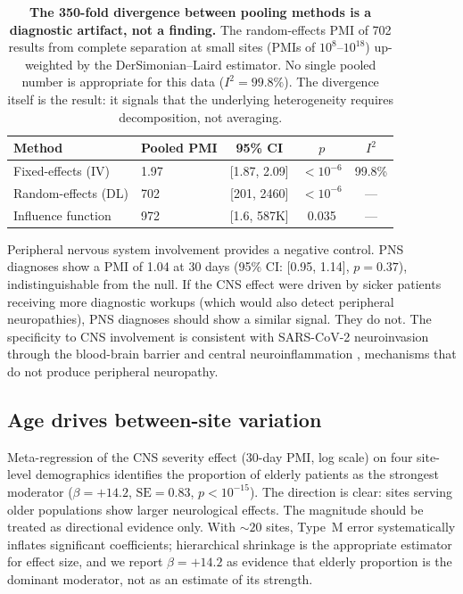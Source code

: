 \documentclass[11pt]{article}
\begin{document}
\begin{table}[t]
\centering
\caption{\textbf{The 350-fold divergence between pooling methods is a
diagnostic artifact, not a finding.}  The random-effects PMI of 702 results
from complete separation at small sites (PMIs of $10^{8}$--$10^{18}$)
up-weighted by the DerSimonian--Laird estimator.  No single pooled number
is appropriate for this data ($I^2 = 99.8\%$).  The divergence itself is
the result: it signals that the underlying heterogeneity requires
decomposition, not averaging.}
\label{tab:meta}
\begin{tabular}{llccc}
\toprule
Method & Pooled PMI & 95\% CI & $p$ & $I^2$ \\
\midrule
Fixed-effects (IV) & 1.97 & [1.87, 2.09] & $< 10^{-6}$ & 99.8\% \\
Random-effects (DL) & 702 & [201, 2460] & $< 10^{-6}$ & --- \\
Influence function & 972 & [1.6, 587K] & 0.035 & --- \\
\bottomrule
\end{tabular}
\end{table}

Peripheral nervous system involvement provides a negative control.  PNS
diagnoses show a PMI of 1.04 at 30 days (95\% CI: [0.95, 1.14],
$p = 0.37$), indistinguishable from the null.  If the CNS effect were
driven by sicker patients receiving more diagnostic workups (which would
also detect peripheral neuropathies), PNS diagnoses should show a similar
signal.  They do not.  The specificity to CNS involvement is consistent
with SARS-CoV-2 neuroinvasion through the blood-brain barrier
\cite{song2021neuroinvasion} and central neuroinflammation
\cite{iadecola2020covid}, mechanisms that do not produce peripheral
neuropathy.


\subsection{Age drives between-site variation}

Meta-regression of the CNS severity effect (30-day PMI, log scale) on four
site-level demographics identifies the proportion of elderly patients as the
strongest moderator ($\beta = +14.2$, $\text{SE} = 0.83$,
$p < 10^{-15}$).  The direction is clear: sites serving older populations
show larger neurological effects.  The magnitude should be treated as
directional evidence only.  With ${\sim}20$ sites, Type~M error
\cite{gelman2014typeMS} systematically inflates significant coefficients;
hierarchical shrinkage is the appropriate estimator for effect size, and
we report $\beta = +14.2$ as evidence that elderly proportion is the
dominant moderator, not as an estimate of its strength.
\end{document}
